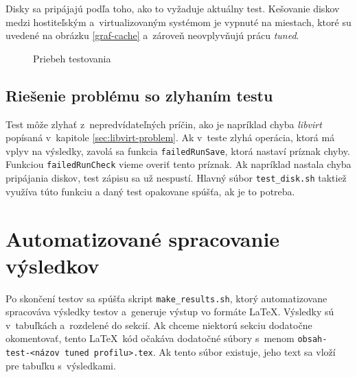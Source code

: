 Disky sa pripájajú podľa toho, ako to vyžaduje aktuálny test. Kešovanie diskov
medzi hostiteľským a~virtualizovaným systémom je vypnuté na miestach, ktoré su
uvedené na obrázku \ref{graf-cache} a~zároveň neovplyvňujú prácu \emph{tuned}. 

%
%

\begin{figure}[ht]
\begin{center}
  \caption{Priebeh testovania}
  \label{pic:testflow}
\end{center}
\end{figure}
%
%

\subsection{Riešenie problému so zlyhaním testu}
\label{sec:test-failure}

Test môže zlyhať z~nepredvídateľných príčin, ako je napríklad chyba
\emph{libvirt} popísaná v~kapitole \ref{sec:libvirt-problem}. Ak v~teste zlyhá
operácia, ktorá má vplyv na výsledky, zavolá sa funkcia \texttt{failedRunSave},
ktorá nastaví príznak chyby. Funkciou \texttt{failedRunCheck} vieme overiť
tento príznak. Ak napríklad nastala chyba pripájania diskov, test zápisu sa už
nespustí. Hlavný súbor \texttt{test\_disk.sh} taktiež využíva túto funkciu a
daný test opakovane spúšťa, ak je to potreba.


\section{Automatizované spracovanie výsledkov}

Po skončení testov sa spúšťa skript \texttt{make\_results.sh}, ktorý
automatizovane spracováva výsledky testov a~generuje výstup vo formáte \LaTeX.
Výsledky sú v~tabuľkách a~rozdelené do sekcií. Ak chceme niektorú sekciu
dodatočne okomentovať, tento \LaTeX~kód očakáva dodatočné súbory s~menom
\texttt{obsah-test-<názov tuned profilu>.tex}. Ak tento súbor existuje, jeho
text sa vloží pre tabuľku s~výsledkami.

